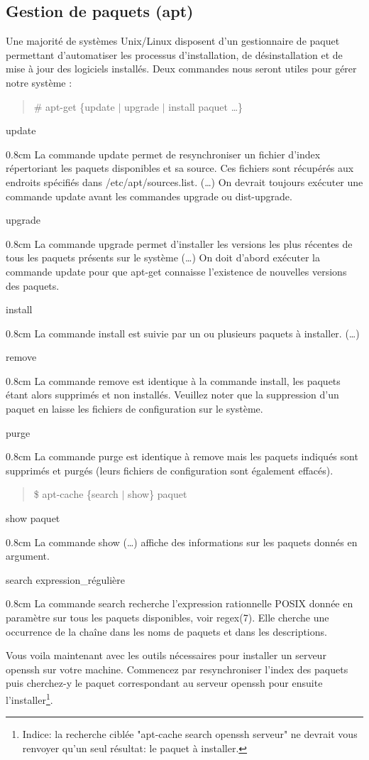 \documentclass[a4paper,11pt]{article}
\newcommand{\commande}[1] {
    \begin{quote}
    \tt\raggedright #1 
    \end{quote}
}
\newcommand{\man}[2]{
    \begin{tcolorbox}[toprule=3mm,width=\textwidth,outer arc=0mm,colbacktitle=grayman,coltitle=black,colback={grayman},colframe={grayman},title={man : \tt #1}]
        \tt\raggedright #2
    \end{tcolorbox}
}
\newcommand{\mandesc}[1]{
    \begin{adjustwidth}{0.8cm}{}
        #1
    \end{adjustwidth}
}
\begin{document}
\subsection{Gestion de paquets (apt)}
\par Une majorité de systèmes Unix/Linux disposent d'un gestionnaire de paquet permettant d'automatiser les processus d'installation, de désinstallation et de mise à jour des logiciels installés. Deux commandes nous seront utiles pour gérer notre système :
\commande{\# apt-get \{update $|$ upgrade $|$ install paquet \ldots\}}
\man{apt-get}{
update
\mandesc{La commande update permet de resynchroniser un fichier d'index répertoriant les paquets disponibles et sa source. Ces fichiers sont récupérés aux endroits spécifiés dans /etc/apt/sources.list. (\ldots) On devrait toujours exécuter une commande update avant les commandes upgrade ou dist-upgrade.}
upgrade
\mandesc{La commande upgrade permet d'installer les versions les plus récentes de tous les paquets présents sur le système (\dots) On doit d'abord exécuter la commande update pour que apt-get connaisse l'existence de nouvelles versions des paquets.}
install
\mandesc{La commande install est suivie par un ou plusieurs paquets à installer. (\ldots)}
remove
\mandesc{La commande remove est identique à la commande install, les paquets étant alors supprimés et non installés. Veuillez noter que la suppression d'un paquet en laisse les fichiers de configuration sur le système.}
purge
\mandesc{La commande purge est identique à remove mais les paquets indiqués sont supprimés et purgés (leurs fichiers de configuration sont également effacés).}
}
\commande{\$ apt-cache \{search $|$ show\} paquet}
\man{apt-cache}{
show paquet
\mandesc{La commande show (\dots) affiche des informations sur les paquets donnés en argument.}
search expression\_régulière
\mandesc{La commande search recherche l'expression rationnelle POSIX donnée en paramètre sur tous les paquets disponibles, voir regex(7). Elle cherche une occurrence de la chaîne dans les noms de paquets et dans les descriptions.}
}
\par Vous voila maintenant avec les outils nécessaires pour installer un serveur openssh sur votre machine. Commencez par resynchroniser l'index des paquets puis cherchez-y le paquet correspondant au serveur openssh pour ensuite l'installer\footnote{Indice: la recherche ciblée "apt-cache search openssh serveur" ne devrait vous renvoyer qu'un seul résultat: le paquet à installer.}.
\end{document}
